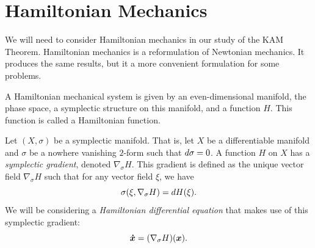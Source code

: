 \documentclass[twoside,letterpaper,10pt]{article}
\newcommand{\sgrad}{\nabla_{\sigma}}
\numberwithin{equation}{section}
\begin{document}

\section{Hamiltonian Mechanics}
\label{sec:hamilt-mech}

We will need to consider Hamiltonian mechanics in our study of the KAM Theorem.
Hamiltonian mechanics is a reformulation of Newtonian mechanics.
It produces the same results, but it a more convenient formulation for some
problems.

A Hamiltonian mechanical system is given by an even-dimensional manifold, the
phase space, a symplectic structure on this manifold, and a function $H$.
This function is called a Hamiltonian function.

Let $(X, \sigma)$ be a symplectic manifold.
That is, let $X$ be a differentiable manifold and $\sigma$ be a nowhere
vanishing $2$-form such that $\mathop{}\!d \sigma = 0$.
A function $H$ on $X$ has a \emph{symplectic gradient}, denoted $\sgrad H$.
This gradient is defined as the unique vector field $\sgrad H$ such that for any
vector field $\xi$, we have
\begin{equation}
  \label{eq:symplectic-grad}
  \sigma(\xi, \sgrad H) = \dif H(\xi).
\end{equation}
We will be considering a \emph{Hamiltonian differential equation} that makes use
of this symplectic gradient:
\begin{equation}
  \label{eq:hamiltonian-diff-eq}
  \bd{x} = (\sgrad H) (\bp{x}).
\end{equation}
\end{document}
